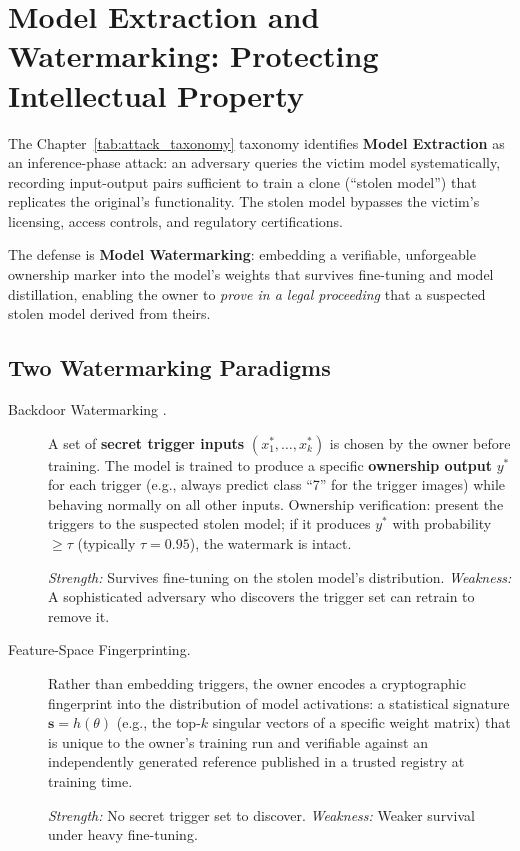 \section{Model Extraction and Watermarking: Protecting Intellectual Property}
\label{sec:model_watermarking}

The Chapter~\ref{tab:attack_taxonomy} taxonomy identifies \textbf{Model Extraction} as an inference-phase attack: an adversary queries the victim model systematically, recording input-output pairs sufficient to train a clone (``stolen model'') that replicates the original's functionality. The stolen model bypasses the victim's licensing, access controls, and regulatory certifications.

The defense is \textbf{Model Watermarking}: embedding a verifiable, unforgeable ownership marker into the model's weights that survives fine-tuning and model distillation, enabling the owner to \emph{prove in a legal proceeding} that a suspected stolen model derived from theirs.

\subsection{Two Watermarking Paradigms}
\label{subsec:watermarking_paradigms}

\begin{description}
  \item[Backdoor Watermarking \cite{adi2018}.]
    A set of \textbf{secret trigger inputs} $(x_1^*, \ldots, x_k^*)$ is chosen by the owner before training. The model is trained to produce a specific \textbf{ownership output} $y^*$ for each trigger (e.g., always predict class ``7'' for the trigger images) while behaving normally on all other inputs. Ownership verification: present the triggers to the suspected stolen model; if it produces $y^*$ with probability $\geq \tau$ (typically $\tau = 0.95$), the watermark is intact.

    \emph{Strength:} Survives fine-tuning on the stolen model's distribution. \emph{Weakness:} A sophisticated adversary who discovers the trigger set can retrain to remove it.

  \item[Feature-Space Fingerprinting.]
    Rather than embedding triggers, the owner encodes a cryptographic fingerprint into the distribution of model activations: a statistical signature $\mathbf{s} = h(\theta)$ (e.g., the top-$k$ singular vectors of a specific weight matrix) that is unique to the owner's training run and verifiable against an independently generated reference published in a trusted registry at training time.

    \emph{Strength:} No secret trigger set to discover. \emph{Weakness:} Weaker survival under heavy fine-tuning.
\end{description}

